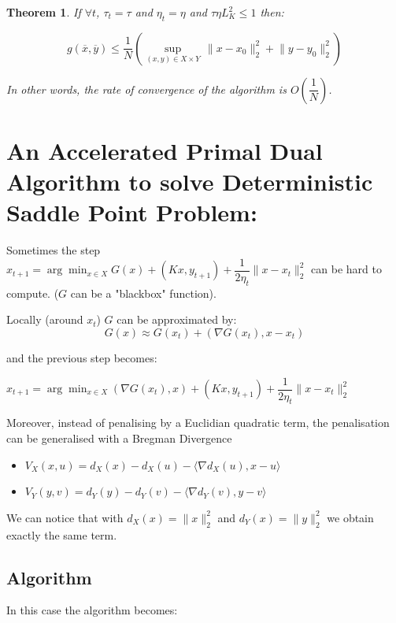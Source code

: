 \documentclass[12pt,reqno]{amsart}
\newtheorem{thm}{Theorem}[section]
\numberwithin{equation}{section}
\begin{document}
\begin{thm}
If $\forall t$, $\tau_{t} = \tau$ and $\eta_{t} = \eta$ and $\tau\eta L_{K}^{2} \leq 1$ then:

$$
g(\overline{x},\overline{y}) \leq \dfrac{1}{N}(\sup_{(x,y)\in X \times Y} \dfrac{}{}\lVert x - x_{0} \rVert_{2}^{2} + \lVert y - y_{0} \rVert_{2}^{2} ) 
$$

In other words, the rate of convergence of the algorithm is $O(\dfrac{1}{N})$.

\end{thm}


\section{ An Accelerated Primal Dual Algorithm to solve Deterministic Saddle Point Problem: }


Sometimes the step $x_{t+1} = \arg\min_{x \in X} G(x) + (Kx,y_{t+1}) + \dfrac{1}{2\eta_{t}}\lVert x - x_{t} \rVert_{2}^{2}$ can be hard to compute.
($G$ can be a "blackbox" function).

Locally (around $x_{t}$) $G$ can be approximated by:
$$
G(x) \approx G(x_{t}) + (\nabla G(x_{t}),x - x_{t})
$$

and the previous step becomes:

$x_{t+1} = \arg\min_{x \in X} (\nabla G(x_{t}),x) + (Kx,y_{t+1}) + \dfrac{1}{2\eta_{t}}\lVert x - x_{t} \rVert_{2}^{2}$

Moreover, instead of penalising by a Euclidian quadratic term, the penalisation can be generalised with a Bregman Divergence

\begin{itemize}
\item $V_{X}(x,u) = d_{X}(x) -  d_{X}(u) - \langle \nabla d_{X}(u),x - u \rangle$
\item $V_{Y}(y,v) = d_{Y}(y) -  d_{Y}(v) - \langle \nabla d_{Y}(v),y - v \rangle$
\end{itemize}

We can notice that with $d_{X}(x) = \lVert x \rVert_{2}^{2}$ and $d_{Y}(x) = \lVert y \rVert_{2}^{2}$ we obtain exactly the same term.

\subsection{Algorithm}

In this case the algorithm becomes:
\end{document}

